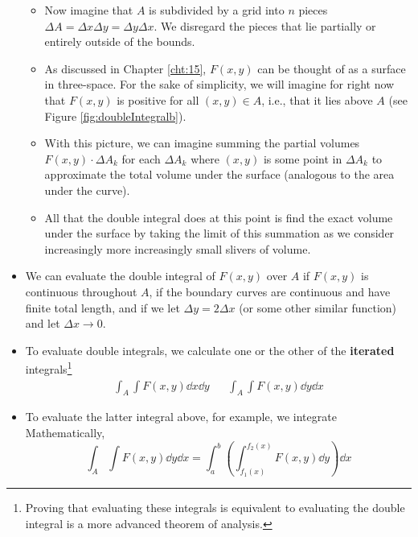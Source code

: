 \documentclass[../main.tex]{subfiles}
\begin{document}
\begin{itemize}
\begin{itemize}
        \item Now imagine that $A$ is subdivided by a grid into $n$ pieces $\Delta A=\Delta x\Delta y=\Delta y\Delta x$. We disregard the pieces that lie partially or entirely outside of the bounds.
        \item As discussed in Chapter \ref{cht:15}, $F(x,y)$ can be thought of as a surface in three-space. For the sake of simplicity, we will imagine for right now that $F(x,y)$ is positive for all $(x,y)\in A$, i.e., that it lies above $A$ (see Figure \ref{fig:doubleIntegralb}).
        \item With this picture, we can imagine summing the partial volumes $F(x,y)\cdot\Delta A_k$ for each $\Delta A_k$ where $(x,y)$ is some point in $\Delta A_k$ to approximate the total volume under the surface (analogous to the area under the curve).
        \item All that the double integral does at this point is find the exact volume under the surface by taking the limit of this summation as we consider increasingly more increasingly small slivers of volume.
    \end{itemize}
    \item We can evaluate the double integral of $F(x,y)$ over $A$ if $F(x,y)$ is continuous throughout $A$, if the boundary curves are continuous and have finite total length, and if we let $\Delta y=2\Delta x$ (or some other similar function) and let $\Delta x\to 0$.
    \item To evaluate double integrals, we calculate one or the other of the \textbf{iterated} integrals\footnote{Proving that evaluating these integrals is equivalent to evaluating the double integral is a more advanced theorem of analysis.}
    \begin{align*}
        \int_A\int F(x,y)\dd{x}\dd{y}&&
            \int_A\int F(x,y)\dd{y}\dd{x}
    \end{align*}
    \item To evaluate the latter integral above, for example, we integrate  Mathematically,
    \begin{equation*}
        \int_A\int F(x,y)\dd{y}\dd{x} = \int_a^b\left( \int_{f_1(x)}^{f_2(x)}F(x,y)\dd{y} \right)\dd{x}
    \end{equation*}
    \begin{figure}[h!]

\end{figure}
\end{itemize}
\end{document}
